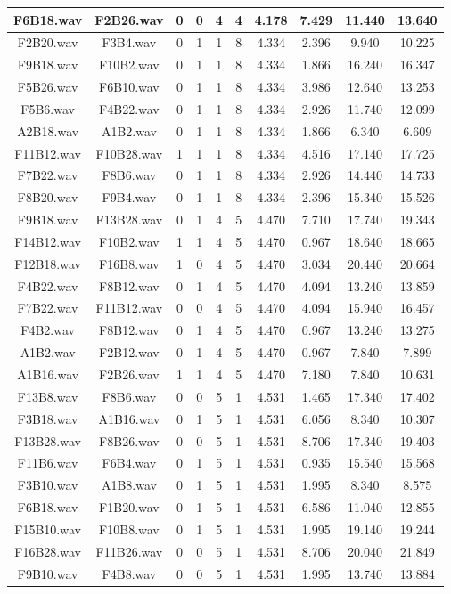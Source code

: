 \documentclass[11pt,a4paper,twoside]{book}
\begin{document}
\begin{longtable}[c]{|c|c|c|c|c|c|c|c|c|c|}
F6B18.wav&F2B26.wav&0&0&4&4&4.178&7.429&11.440&13.640\\ \hline
F2B20.wav&F3B4.wav&0&1&1&8&4.334&2.396&9.940&10.225\\ \hline
F9B18.wav&F10B2.wav&0&1&1&8&4.334&1.866&16.240&16.347\\ \hline
F5B26.wav&F6B10.wav&0&1&1&8&4.334&3.986&12.640&13.253\\ \hline
F5B6.wav&F4B22.wav&0&1&1&8&4.334&2.926&11.740&12.099\\ \hline
A2B18.wav&A1B2.wav&0&1&1&8&4.334&1.866&6.340&6.609\\ \hline
F11B12.wav&F10B28.wav&1&1&1&8&4.334&4.516&17.140&17.725\\ \hline
F7B22.wav&F8B6.wav&0&1&1&8&4.334&2.926&14.440&14.733\\ \hline
F8B20.wav&F9B4.wav&0&1&1&8&4.334&2.396&15.340&15.526\\ \hline
F9B18.wav&F13B28.wav&0&1&4&5&4.470&7.710&17.740&19.343\\ \hline
F14B12.wav&F10B2.wav&1&1&4&5&4.470&0.967&18.640&18.665\\ \hline
F12B18.wav&F16B8.wav&1&0&4&5&4.470&3.034&20.440&20.664\\ \hline
F4B22.wav&F8B12.wav&0&1&4&5&4.470&4.094&13.240&13.859\\ \hline
F7B22.wav&F11B12.wav&0&0&4&5&4.470&4.094&15.940&16.457\\ \hline
F4B2.wav&F8B12.wav&0&1&4&5&4.470&0.967&13.240&13.275\\ \hline
A1B2.wav&F2B12.wav&0&1&4&5&4.470&0.967&7.840&7.899\\ \hline
A1B16.wav&F2B26.wav&1&1&4&5&4.470&7.180&7.840&10.631\\ \hline
F13B8.wav&F8B6.wav&0&0&5&1&4.531&1.465&17.340&17.402\\ \hline
F3B18.wav&A1B16.wav&0&1&5&1&4.531&6.056&8.340&10.307\\ \hline
F13B28.wav&F8B26.wav&0&0&5&1&4.531&8.706&17.340&19.403\\ \hline
F11B6.wav&F6B4.wav&0&1&5&1&4.531&0.935&15.540&15.568\\ \hline
F3B10.wav&A1B8.wav&0&1&5&1&4.531&1.995&8.340&8.575\\ \hline
F6B18.wav&F1B20.wav&0&1&5&1&4.531&6.586&11.040&12.855\\ \hline
F15B10.wav&F10B8.wav&0&1&5&1&4.531&1.995&19.140&19.244\\ \hline
F16B28.wav&F11B26.wav&0&0&5&1&4.531&8.706&20.040&21.849\\ \hline
F9B10.wav&F4B8.wav&0&0&5&1&4.531&1.995&13.740&13.884\\ \hline

\end{longtable}
\end{document}
